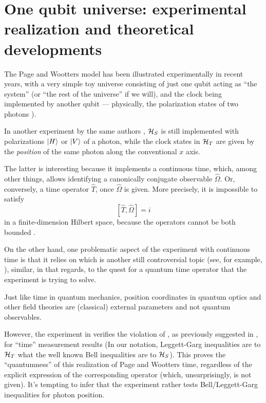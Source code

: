 \section{%
  One qubit universe: experimental realization and theoretical developments}


The Page and Wootters model has been illustrated experimentally in recent years,
with a very simple toy universe consisting of just one qubit acting as ``the system'' (or
``the rest of the universe'' if we will), and the clock being implemented by another qubit ---
physically, the polarization states of two photons \parencite{Moreva:synthetic,Moreva:illustration}).

In another experiment by the same authors \parencite{Moreva_position}, $\mathcal{H}_S$ is still implemented with 
polarizations $\ket{H}$ or $\ket{V}$ of a photon, while the clock states in $\mathcal{H}_T$
are given by the \emph{position} of the same photon along the conventional $x$ axis.

The latter is interesting because it implements a continuous time,
which, among other things, allows identifying a canonically conjugate observable
$\hat{\Omega}$. Or, conversely, a time operator $\hat{T}$, once $\hat{\Omega}$ is given.
More precisely, it is impossible to satisfy
\begin{equation}\label{eq:canonical_commutation_in_time}
  [\hat{T}, \hat{\Omega}] = i
\end{equation}
in a finite-dimension Hilbert space, because the operators
cannot be both bounded \parencite{Weyl1927}.

On the other hand, one problematic aspect of the experiment with continuous time
is that
it relies on  which is another
still controversial topic (see, for example, \cite{HawtonPhotonPosition}),
similar, in that regards, to the quest for a quantum time operator that the experiment is trying to solve.

Just like time in quantum mechanics, position coordinates in quantum optics and other field theories
are (classical) external parameters and not quantum observables. 

However, the experiment in \cite{Moreva_position} verifies the violation of
, as previously suggested in \cite{LeggettGarg+PageWootters},
for ``time'' measurement results
(In our notation, Leggett-Garg inequalities are to $\mathcal{H}_T$ what the well known Bell inequalities
  are to $\mathcal{H}_S$).
This proves the ``quantumness'' of this realization of Page and Wootters time,
regardless of the explicit expression of the corresponding operator (which, unsurprisingly,
is not given). It's tempting to infer that the experiment
rather tests Bell/Leggett-Garg inequalities for photon position.

